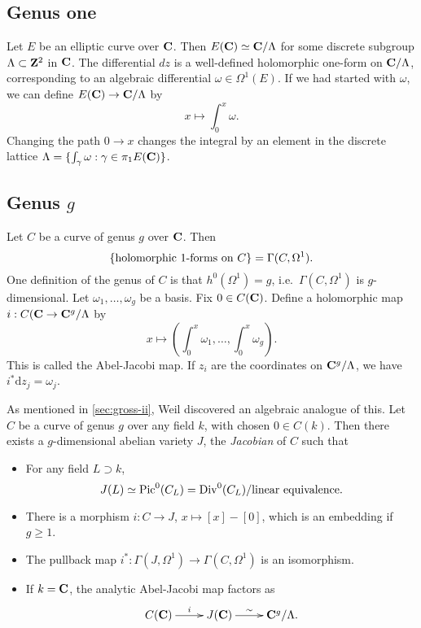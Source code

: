 \subsection{Genus one}

Let $E$ be an elliptic curve over $\mathbf{C}$. Then $E(\mathbf{C})\simeq \mathbf{C}/\Lambda$ for 
some discrete subgroup $\Lambda\subset \mathbf{Z}^2$ in $\mathbf{C}$. The differential 
$d z$ is a well-defined holomorphic one-form on $\mathbf{C}/\Lambda$, corresponding to 
an algebraic differential $\omega\in \Omega^1(E)$. If we had started with 
$\omega$, we can define $E(\mathbf{C})\to \mathbf{C}/\Lambda$ by 
\[
  x\mapsto \int_0^x \omega .
\]
Changing the path $0\to x$ changes the integral by an element in the discrete 
lattice $\Lambda=\{\int_\gamma\omega:\gamma\in \pi_1 E(\mathbf{C})\}$. 





\subsection{Genus \texorpdfstring{$g$}{g}}

Let $C$ be a curve of genus $g$ over $\mathbf{C}$. Then 
\[
  \{\textnormal{holomorphic 1-forms on $C$}\} = \Gamma(C,\Omega^1) .
\]
One definition of the genus of $C$ is that $h^0(\Omega^1) = g$, 
i.e.~$\Gamma(C,\Omega^1)$ is $g$-dimensional. Let $\omega_1,\dots,\omega_g$ be a 
basis. Fix $0\in C(\mathbf{C})$. Define a holomorphic map 
$i:C(\mathbf{C}\to \mathbf{C}^g/\Lambda$ by 
\[
  x\mapsto \left(\int_0^x \omega_1,\dots,\int_0^x \omega_g\right) .
\]
This is called the Abel-Jacobi map. If $z_i$ are the coordinates on 
$\mathbf{C}^g/\Lambda$, we have $i^\ast \mathrm{d}z_j = \omega_j$. 

As mentioned in \autoref{sec:gross-ii}, Weil discovered an algebraic analogue 
of this. Let $C$ be a curve of genus $g$ over any field $k$, with chosen 
$0\in C(k)$. Then there exists a $g$-dimensional abelian variety $J$, the 
\emph{Jacobian} of $C$ such that 
\begin{itemize}
  \item For any field $L\supset k$, 
    \[
      J(L) \simeq \operatorname{Pic}^0(C_L) = \operatorname{Div}^0(C_L) / \textnormal{linear equivalence} .
    \]
  \item There is a morphism $i:C\to J$, $x\mapsto [x]-[0]$, which is an 
    embedding if $g\geqslant 1$. 
  \item The pullback map $i^\ast:\Gamma(J,\Omega^1) \to \Gamma(C,\Omega^1)$ is 
    an isomorphism. 
  \item If $k=\mathbf{C}$, the analytic Abel-Jacobi map factors as 
    \[\xymatrix{
      C(\dC) \ar[r]^-i 
        & J(\dC) \ar[r]^-\sim 
        & \dC^g/\Lambda .
    }\]
\end{itemize}

